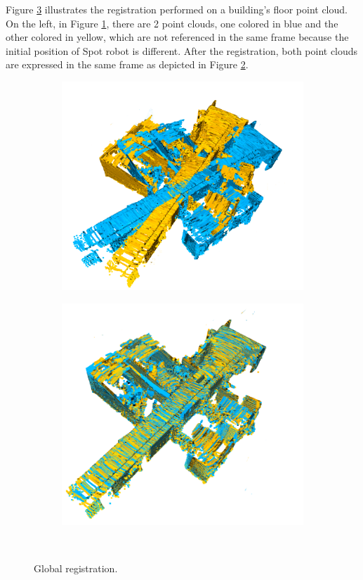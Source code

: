 Figure \ref{fig:06_glob_reg} illustrates the registration performed on a building's floor point cloud. On the left, in Figure \ref{fig:06_glob_reg1}, there are 2 point clouds, one colored in blue and the other colored in yellow, which are not referenced in the same frame because the initial position of Spot robot is different. After the registration, both point clouds are expressed in the same frame as depicted in Figure \ref{fig:06_glob_reg2}. 
\begin{figure}
    \begin{subfigure}{.48\linewidth}
    \centering
    \includegraphics[scale=0.22]{Img/06_ICP0.png}
    \caption{}
    \label{fig:06_glob_reg1}
    \end{subfigure}
    \begin{subfigure}{.48\linewidth}
    \centering
    \includegraphics[scale=0.24]{Img/06_ICP1.png}
    \caption{}
    \label{fig:06_glob_reg2}
    \end{subfigure}\\
    \caption{Global registration.}
    \label{fig:06_glob_reg}
\end{figure}
